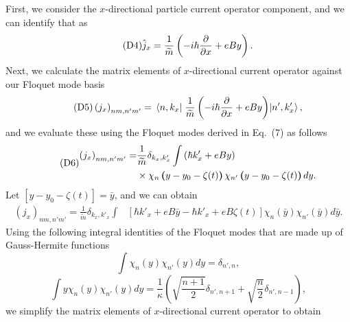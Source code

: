 \documentclass{article}
\begin{document}
\begin{itemize}
{  First, we consider the $x$-directional particle current operator component, and we can identify that as
  \begin{equation} \tag{D4}
    \hat{j}_x = \frac{1}{\widetilde{m}} \left(-i\hbar\pdv{x} + eBy \right).
  \end{equation}
  Next, we calculate the matrix elements of $x$-directional current operator against our Floquet mode basis
  \begin{equation} \tag{D5}
    \left({j}_x \right)_{nm,n'm'} =
    \mel{n,k_x}{\;\frac{1}{\widetilde{m}} \left(-i\hbar\pdv{x} + eBy \right)}{n',k'_x},
  \end{equation}
  and we evaluate these using the Floquet modes derived in Eq.~(7) as follows
  \begin{equation} \tag{D6}
    \begin{aligned}
      \left({j}_x \right)_{nm,n'm'} = &
      \frac{1}{{\widetilde{m}}}
      \delta_{k_x,k'_x}
      \int
      \left(\hbar k'_x + eBy\right) \\
      & \times
       \chi_{n}\bm{\left(}y - y_0 - \zeta(t)\bm{\right)}
      \chi_{n'}\bm{\left(}y - y_0 - \zeta(t)\bm{\right)}
      dy.
    \end{aligned}
  \end{equation}
  Let $[y - y_0 - \zeta(t)] = \bar{y}$, and we can obtain
  \begin{equation} \tag{D7}
    \begin{aligned}
      \left({j}_x \right)_{nm,n'm'} =
      \frac{1}{{\widetilde{m}}}
      \delta_{k_x,k'_x}
      \int &
      \left[ \hbar k'_x + eB\bar{y} -\hbar k'_x + eB\zeta(t)\right]
      \chi_{n}(\bar{y})
      \chi_{n'}(\bar{y})
      d\bar{y}.
    \end{aligned}
  \end{equation}
  Using the following integral identities of the Floquet modes that are made up of Gauss-Hermite functions \cite{vedenyapin11,szego59}
  \begin{equation} \tag{D8}
    \int
    \chi_{n}({y})
    \chi_{n'}({y}) d{y} =
    \delta_{n',n},
  \end{equation}
  \begin{equation} \tag{D9}
    \int
    y \chi_{n}({y})\chi_{n'}({y}) d{y} =
    \frac{1}{\kappa}
    \left(\sqrt{\frac{n+1}{2}} \delta_{n',n+1} + \sqrt{\frac{n}{2}}
    \delta_{n',n-1} \right),
  \end{equation}
  we simplify the matrix elements of $x$-directional current operator to obtain
  \begin{equation} \tag{D10}

\end{equation}}
\end{itemize}
\end{document}
